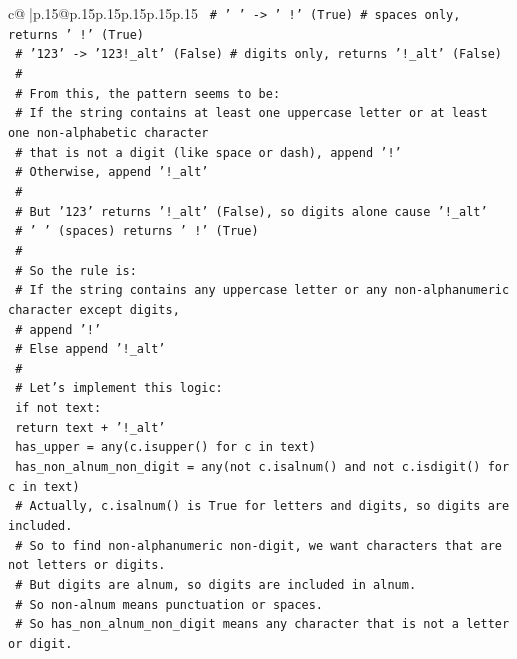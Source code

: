 \documentclass{article}
\begin{document}
{\begin{supertabular}{c@{$\;$}|p{.15\linewidth}@{}p{.15\linewidth}p{.15\linewidth}p{.15\linewidth}p{.15\linewidth}p{.15\linewidth}}
{{{\texttt{    \# '   ' {-}> '   !' (True)      \# spaces only, returns '   !' (True)} \\
\texttt{    \# '123' {-}> '123!\_alt' (False) \# digits only, returns '!\_alt' (False)} \\
\texttt{    \#} \\
\texttt{    \# From this, the pattern seems to be:} \\
\texttt{    \# If the string contains at least one uppercase letter or at least one non{-}alphabetic character} \\
\texttt{    \# that is not a digit (like space or dash), append '!'} \\
\texttt{    \# Otherwise, append '!\_alt'} \\
\texttt{    \#} \\
\texttt{    \# But '123' returns '!\_alt' (False), so digits alone cause '!\_alt'} \\
\texttt{    \# '   ' (spaces) returns '   !' (True)} \\
\texttt{    \#} \\
\texttt{    \# So the rule is:} \\
\texttt{    \# If the string contains any uppercase letter or any non{-}alphanumeric character except digits,} \\
\texttt{    \# append '!'} \\
\texttt{    \# Else append '!\_alt'} \\
\texttt{    \#} \\
\texttt{    \# Let's implement this logic:} \\
\texttt{    if not text:} \\
\texttt{        return text + '!\_alt'} \\
\texttt{    has\_upper = any(c.isupper() for c in text)} \\
\texttt{    has\_non\_alnum\_non\_digit = any(not c.isalnum() and not c.isdigit() for c in text)} \\
\texttt{    \# Actually, c.isalnum() is True for letters and digits, so digits are included.} \\
\texttt{    \# So to find non{-}alphanumeric non{-}digit, we want characters that are not letters or digits.} \\
\texttt{    \# But digits are alnum, so digits are included in alnum.} \\
\texttt{    \# So non{-}alnum means punctuation or spaces.} \\
\texttt{    \# So has\_non\_alnum\_non\_digit means any character that is not a letter or digit.} \\
}}}
\end{supertabular}}
\end{document}
